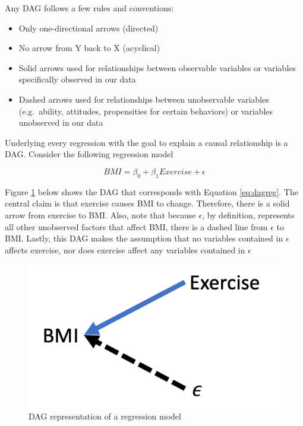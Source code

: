 \documentclass[
]{book}
\providecommand{\tightlist}{%
  \setlength{\itemsep}{0pt}\setlength{\parskip}{0pt}}
\begin{document}
Any DAG follows a few rules and conventions:

\begin{itemize}
\tightlist
\item
  Only one-directional arrows (directed)
\item
  No arrow from Y back to X (acyclical)
\item
  Solid arrows used for relationships between observable variables or variables specifically observed in our data
\item
  Dashed arrows used for relationships between unobservable variables (e.g.~ability, attitudes, propensities for certain behaviors) or variables unobserved in our data
\end{itemize}

Underlying every regression with the goal to explain a causal relationship is a DAG. Consider the following regression model

\begin{equation}
BMI = \beta_0 + \beta_1Exercise + \epsilon
\label{eq:dagreg}
\end{equation}

Figure \ref{fig:dagreg} below shows the DAG that corresponds with Equation \eqref{eq:dagreg}. The central claim is that exercise causes BMI to change. Therefore, there is a solid arrow from exercise to BMI. Also, note that because \(\epsilon\), by definition, represents all other unobserved factors that affect BMI, there is a dashed line from \(\epsilon\) to BMI. Lastly, this DAG makes the assumption that no variables contained in \(\epsilon\) affects exercise, nor does exercise affect any variables contained in \(\epsilon\)

\begin{figure}
\includegraphics[width=7.19in]{images/dag_reg} \caption{DAG representation of a regression model}\label{fig:dagreg}
\end{figure}
\end{document}
